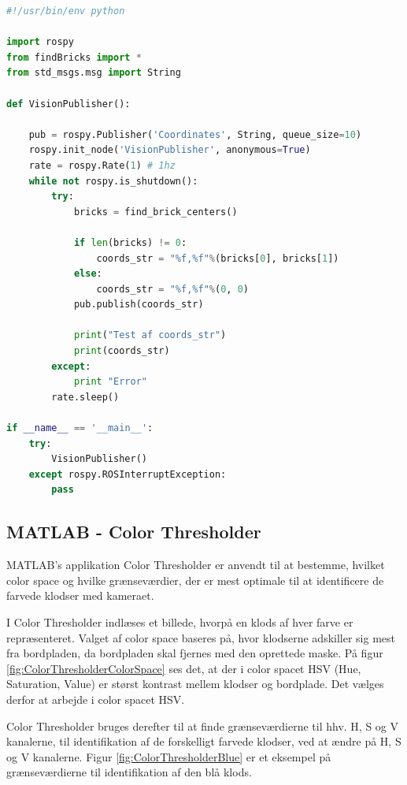 \begin{lstlisting}[language=Python]
#!/usr/bin/env python

import rospy
from findBricks import *
from std_msgs.msg import String

def VisionPublisher():
    
    pub = rospy.Publisher('Coordinates', String, queue_size=10)
    rospy.init_node('VisionPublisher', anonymous=True)
    rate = rospy.Rate(1) # 1hz
    while not rospy.is_shutdown():
        try:
            bricks = find_brick_centers()
            
            if len(bricks) != 0:        
                coords_str = "%f,%f"%(bricks[0], bricks[1])
            else:
                coords_str = "%f,%f"%(0, 0)          
            pub.publish(coords_str)
            
            print("Test af coords_str")
            print(coords_str)
        except:
            print "Error"
        rate.sleep()

if __name__ == '__main__':
    try:
        VisionPublisher()
    except rospy.ROSInterruptException:
        pass
\end{lstlisting}

\newpage
\subsection{MATLAB - Color Thresholder}
MATLAB's  applikation Color Thresholder er anvendt til at bestemme, hvilket color space og hvilke grænseværdier, der er mest optimale til at identificere de farvede klodser med kameraet.

I Color Thresholder indlæses et billede, hvorpå en klods af hver farve er repræsenteret.
Valget af color space baseres på, hvor klodserne adskiller sig mest fra bordpladen, da bordpladen skal fjernes med den oprettede maske.
På figur \ref{fig:ColorThresholderColorSpace} ses det, at der i color spacet HSV (Hue, Saturation, Value) er størst kontrast mellem klodser og bordplade.
Det vælges derfor at arbejde i color spacet HSV.


Color Thresholder bruges derefter til at finde grænseværdierne til hhv. H, S og V kanalerne, til identifikation af de forskelligt farvede klodser, ved at ændre på H, S og V kanalerne.
Figur \vref{fig:ColorThresholderBlue} er et eksempel på grænseværdierne til identifikation af den blå klods.

